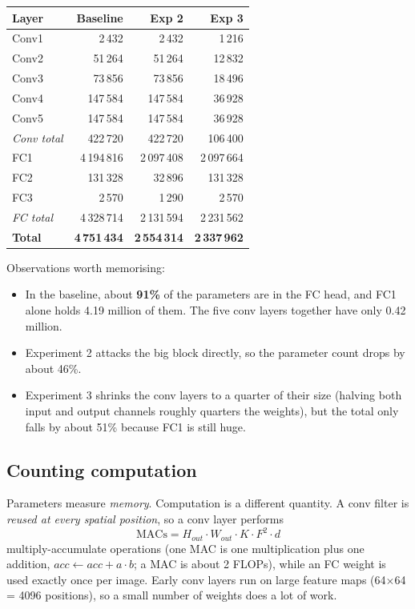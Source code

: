 \documentclass[11pt]{article}
\begin{document}
\begin{center}
\begin{tabular}{lrrr}
\toprule
Layer & Baseline & Exp 2 & Exp 3 \\
\midrule
Conv1 & 2\,432 & 2\,432 & 1\,216 \\
Conv2 & 51\,264 & 51\,264 & 12\,832 \\
Conv3 & 73\,856 & 73\,856 & 18\,496 \\
Conv4 & 147\,584 & 147\,584 & 36\,928 \\
Conv5 & 147\,584 & 147\,584 & 36\,928 \\
\midrule
\emph{Conv total} & 422\,720 & 422\,720 & 106\,400 \\
\midrule
FC1 & 4\,194\,816 & 2\,097\,408 & 2\,097\,664 \\
FC2 & 131\,328 & 32\,896 & 131\,328 \\
FC3 & 2\,570 & 1\,290 & 2\,570 \\
\midrule
\emph{FC total} & 4\,328\,714 & 2\,131\,594 & 2\,231\,562 \\
\midrule
\textbf{Total} & \textbf{4\,751\,434} & \textbf{2\,554\,314} & \textbf{2\,337\,962} \\
\bottomrule
\end{tabular}
\end{center}

Observations worth memorising:
\begin{itemize}[noitemsep]
\item In the baseline, about \textbf{91\%} of the parameters are in the FC head, and FC1 alone holds 4.19 million of them. The five conv layers together have only 0.42 million.
\item Experiment 2 attacks the big block directly, so the parameter count drops by about 46\%.
\item Experiment 3 shrinks the conv layers to a quarter of their size (halving both input and output channels roughly quarters the weights), but the total only falls by about 51\% because FC1 is still huge.
\end{itemize}

\subsection{Counting computation}

Parameters measure \emph{memory}. Computation is a different quantity. A conv filter is \emph{reused at every spatial position}, so a conv layer performs
\[
\text{MACs} = H_{out}\cdot W_{out}\cdot K\cdot F^2\cdot d
\]
multiply-accumulate operations (one MAC is one multiplication plus one addition, $acc \leftarrow acc + a\cdot b$; a MAC is about 2 FLOPs), while an FC weight is used exactly once per image. Early conv layers run on large feature maps (64$\times$64 = 4096 positions), so a small number of weights does a lot of work.
\end{document}
